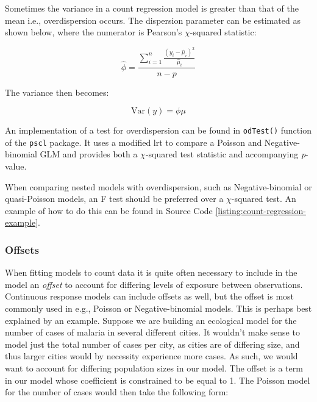 \documentclass{report}
\begin{document}
Sometimes the variance in a count regression model is greater than that of the mean i.e., overdispersion occurs. The dispersion parameter can be estimated as shown below, where the numerator is Pearson's $\chi$-squared statistic:

\begin{equation}\label{eq:glm-poisson-overdispersion}
    \hat{\phi} = \frac{\sum_{i=1}^n\frac{\left(y_i - \hat{\mu}_i\right)^2}{\hat{\mu}_i}}{n-p}
\end{equation}

The variance then becomes:

\begin{equation}\label{eq:glm-poisson-overdispersed-variance}
    \text{Var}(y) = \phi\mu
\end{equation}

An implementation of a test for overdispersion can be found in \texttt{odTest()} function of the \texttt{pscl} package. It uses a modified \gls{lrt} to compare a Poisson and Negative-binomial GLM and provides both a $\chi$-squared test statistic and accompanying \textit{p}-value. 

When comparing nested models with overdispersion, such as Negative-binomial or quasi-Poisson models, an F test should be preferred over a $\chi$-squared test. An example of how to do this can be found in Source Code \ref{listing:count-regression-example}. 

\subsubsection{Offsets}

When fitting models to count data it is quite often necessary to include in the model an \textit{offset} to account for differing levels of exposure between observations. Continuous response models can include offsets as well, but the offset is most commonly used in e.g., Poisson or Negative-binomial models. This is perhaps best explained by an example. Suppose we are building an ecological model for the number of cases of malaria in several different cities. It wouldn't make sense to model just the total number of cases per city, as cities are of differing size, and thus larger cities would by necessity experience more cases. As such, we would want to account for differing population sizes in our model. The offset is a term in our model whose coefficient is constrained to be equal to 1. The Poisson model for the number of cases would then take the following form:
\end{document}
